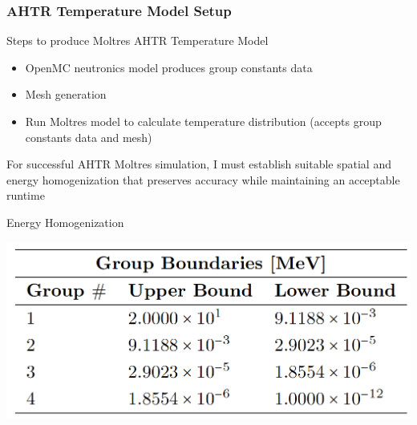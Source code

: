 \begin{frame}
    \frametitle{AHTR Temperature Model Setup}
    \begin{block}{Steps to produce Moltres AHTR Temperature Model}
        \begin{itemize}
          \item OpenMC neutronics model produces group constants data 
          \item Mesh generation
          \item Run Moltres model to calculate temperature distribution 
          (accepts group constants data and mesh)
        \end{itemize}
    \end{block}
    For successful AHTR Moltres simulation, I must establish suitable spatial and
    energy homogenization that preserves accuracy while maintaining an acceptable
    runtime
    \begin{block}{Energy Homogenization}
        \begin{table}[]
            \centering
            \begin{minipage}[c]{0.6\textwidth}
                \centering
                \includegraphics[width=0.8\linewidth]{figures/ahtr-energy-discr.png}
            \end{minipage}\hfill
            \begin{minipage}[c]{0.4\textwidth}
            \caption{4-group energy structures for AHTR geometry 
            derived by \cite{gentry_development_2016}.}
        \end{minipage}
        \end{table}
    \end{block}
\end{frame}

